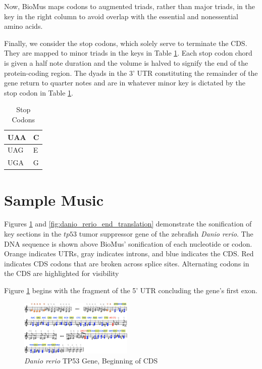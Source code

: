 \documentclass[letterpaper]{article}
\begin{document}
Now, BioMus maps codons to augmented triads, rather than major triads, in the key in the right column to avoid overlap with the essential and nonessential amino acids.


Finally, we consider the stop codons, which solely serve to terminate the CDS. They are mapped to minor triads in the keys in Table  \ref{table:stop_codons}. Each stop codon chord is given a half note duration and the volume is halved to signify the end of the protein-coding region. The dyads in the 3’ UTR constituting the remainder of the gene return to quarter notes and are in whatever minor key is dictated by the stop codon in Table  \ref{table:stop_codons}.

\begin{table}[h!]
\centering
\vspace{-2mm}
\begin{tabular}{|l|l|}
\hline
UAA & C \\ \hline
UAG & E \\ \hline
UGA & G \\ \hline
\end{tabular}
\caption{Stop Codons}
\label{table:stop_codons}
\vspace{-6mm}
\end{table}

\section{Sample Music}

Figures \ref{fig:danio_rerio_start_translation} and \ref{fig:danio_rerio_end_translation} demonstrate the sonification of key sections in the $tp53$ tumor suppressor gene of the zebrafish \textit{Danio rerio}. The DNA sequence is shown above BioMus’ sonification of each nucleotide or codon. Orange indicates UTRs, gray indicates introns, and blue indicates the CDS. Red indicates CDS codons that are broken across splice sites. Alternating codons in the CDS are highlighted for visibility

Figure \ref{fig:danio_rerio_start_translation} begins with the fragment of the 5' UTR concluding the gene's first exon. 

\begin{figure}[h!]
\centering
\vspace{-2mm}
\includegraphics[width=0.48\textwidth]{images/danio_rerio_start_translation}
  \caption{\textit{Danio rerio} TP53 Gene, Beginning of CDS}
  \label{fig:danio_rerio_start_translation}
  \vspace{-3mm}
\end{figure}
\end{document}
